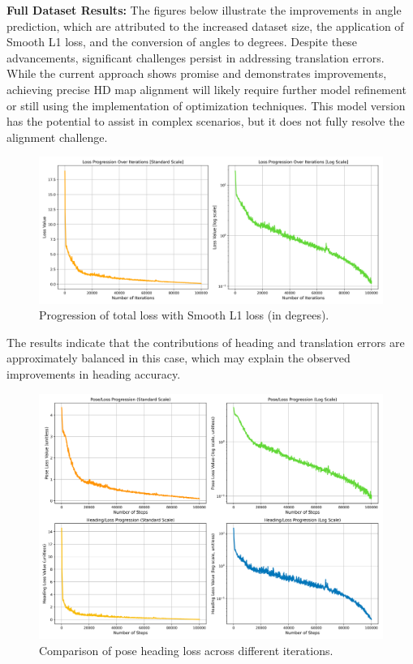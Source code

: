\textbf{Full Dataset Results:} The figures below illustrate the improvements in angle prediction, which are attributed to the increased dataset size, the application of Smooth L1 loss, and the conversion of angles to degrees. Despite these advancements, significant challenges persist in addressing translation errors. While the current approach shows promise and demonstrates improvements, achieving precise HD map alignment will likely require further model refinement or still using the implementation of optimization techniques. This model version has the potential to assist in complex scenarios, but it does not fully resolve the alignment challenge.
\begin{figure}[H]
    \centering
    \includegraphics[width=1\linewidth]{loss_total_l1sDEG_progression_comparison.png}
    \caption{Progression of total loss with Smooth L1 loss (in degrees).}
    \label{fig:total-loss-progression}
\end{figure}

The results indicate that the contributions of heading and translation errors are approximately balanced in this case, which may explain the observed improvements in heading accuracy.
\begin{figure}[H]
    \centering
    \includegraphics[width=1\linewidth]{LateX//figs/l1sDEG_pose_heading_loss_comparison.png}
    \caption{Comparison of pose heading loss across different iterations.}
    \label{fig:pose-heading-loss-2}
\end{figure}

